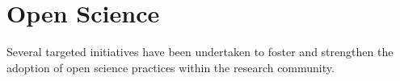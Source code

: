 %
\section{Open Science}







Several targeted initiatives have been undertaken to foster and strengthen the adoption of open science practices within the research community.

